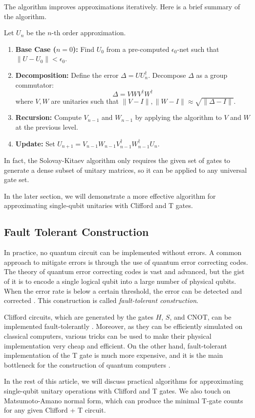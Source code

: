 The algorithm improves approximations iteratively. 
Here is a brief summary of the algorithm.

Let $U_n$ be the $n$-th order approximation.
\begin{enumerate}
    \item \textbf{Base Case ($n=0$):} Find $U_0$ from a pre-computed $\epsilon_0$-net such that $\|U - U_0\| < \epsilon_0$.
    \item \textbf{Decomposition:} Define the error $\Delta = U U_n^\dagger$. Decompose $\Delta$ as a group commutator:
    \[ \Delta = V W V^\dagger W^\dagger \]
    where $V, W$ are unitaries such that $\|V-I\|, \|W-I\| \approx \sqrt{\| \Delta - I \|}$.
    \item \textbf{Recursion:} Compute $V_{n-1}$ and $W_{n-1}$ by applying the algorithm to $V$ and $W$ at the previous level.
    \item \textbf{Update:} Set $U_{n+1} = V_{n-1} W_{n-1} V_{n-1}^\dagger W_{n-1}^\dagger U_n$.
\end{enumerate}

In fact, the Solovay-Kitaev algorithm only requires the given set of gates to generate a dense subset of unitary matrices, so it can be applied to any universal gate set.

In the later section, we will demonstrate a more effective algorithm for approximating single-qubit unitaries with Clifford and T gates.

\subsection{Fault Tolerant Construction}

In practice, no quantum circuit can be implemented without errors.
A common approach to mitigate errors is through the use of quantum error correcting codes.
The theory of quantum error correcting codes is vast and advanced, but the gist of it is to encode a single logical qubit into a large number of physical qubits. 
When the error rate is below a certain threshold, the error can be detected and corrected \cite{Nielsen_Chuang_2010}.  
This construction is called \textit{fault-tolerant construction}.

Clifford circuits, which are generated by the gates $H$, $S$, and CNOT, can be implemented fault-tolerantly \cite{Nielsen_Chuang_2010}. 
Moreover, as they can be efficiently simulated on classical computers, various tricks can be used to make their physical implementation very cheap and efficient. 
On the other hand, fault-tolerant implementation of the T gate is much more expensive, and it is the main bottleneck for the construction of quantum computers \cite{Nielsen_Chuang_2010}. 

In the rest of this article, we will discuss practical algorithms for approximating single-qubit unitary operations with Clifford and T gates. 
We also touch on Matsumoto-Amano normal form, which can produce the minimal T-gate counts for any given Clifford + T circuit. 
